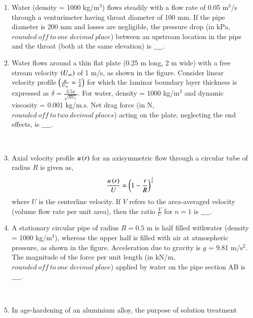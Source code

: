 \documentclass[journal]{IEEEtran}
\begin{document}
\begin{enumerate}
\item Water (density = 1000 kg/$\text{m}^3$) flows steadily with a flow rate of 0.05 $\text{m}^3$/s through a venturimeter having throat diameter of 100 mm. If the pipe diameter is 200 mm and losses are negligible, the pressure drop (in kPa, $rounded\ off\ to\ one\ decimal\ place$) between an upstream location in the pipe and the throat (both at the same elevation) is $\_\_\_\_$. \\
\item Water flows around a thin flat plate (0.25 m long, 2 m wide) with a free stream velocity $\left(U_{\infty}\right)$ of 1 m/s, as shown in the figure. Consider linear velocity profile $\left(\frac{u}{U_{\infty}} = \frac{y}{\delta}\right)$ for which the laminar boundary layer thickness is expressed as $\delta = \frac{3.5x}{\sqrt{Re_x}}$. For water, density = 1000 kg/$\text{m}^3$ and dynamic viscosity = 0.001 kg/m.s. Net drag force (in N, $rounded\ off\ to\ two\ decimal\ places$) acting on the plate, neglecting the end effects, is $\_\_\_\_$. 
\begin{figure}[!ht]
\centering
\resizebox{0.7\textwidth}{!}{%

}%
\end{figure} \\
\item Axial velocity profile $u\left(r\right)$ for an axisymmetric flow through a circular tube of radius $R$ is given as,
\begin{align*}
    \frac{u\left(r\right)}{U} = \left(1 - \frac{r}{R}\right)^{\frac{1}{n}}
\end{align*}
where $U$ is the centerline velocity. If $V$ refers to the area-averaged velocity (volume flow rate per unit area), then the ratio $\frac{V}{U}$ for $n = 1$  is $\_\_\_\_$. \\
\item A stationary circular pipe of radius $R = 0.5$ m is half filled withwater (density = 1000 kg/$\text{m}^3$), whereas the upper half is filled with air at atmospheric pressure, as shown in the figure. Acceleration due to gravity is $g$ = 9.81 m/$\text{s}^2$. The magnitude of the force per unit length (in kN/m, $rounded\ off\ to\ one\ decimal\ place$) applied by water on the pipe section AB is $\_\_\_\_$.
\begin{figure}[!ht]
\centering
\resizebox{0.5\textwidth}{!}{%

}%
\end{figure} \\
\item In age-hardening of an aluminium alloy, the purpose of solution treatment

\end{enumerate}
\end{document}
